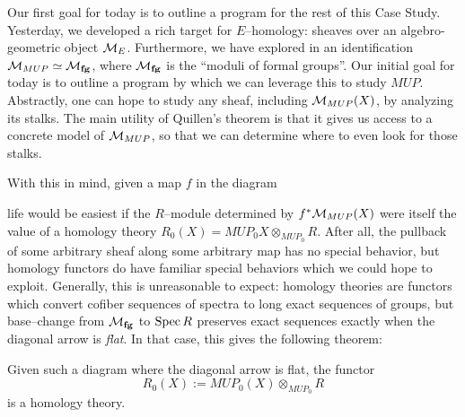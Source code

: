 Our first goal for today is to outline a program for the rest of this Case Study.  Yesterday, we developed a rich target for $E$--homology: sheaves over an algebro-geometric object $\mathcal{M}_{E}$.  Furthermore, we have explored in  an identification $\mathcal{M}_{MUP} \simeq \mathcal{M}_{\mathbf{fg}}$, where $\mathcal{M}_{\mathbf{fg}}$ is the ``moduli of formal groups''.  Our initial goal for today is to outline a program by which we can leverage this to study $MUP$.  Abstractly, one can hope to study any sheaf, including $\mathcal{M}_{MUP}(X)$, by analyzing its stalks.  The main utility of Quillen's theorem is that it gives us access to a concrete model of $\mathcal{M}_{MUP}$, so that we can determine where to even look for those stalks.

With this in mind, given a map $f$ in the diagram
\begin{center}
\end{center}
life would be easiest if the $R$--module determined by $f^* \mathcal{M}_{MUP}(X)$ were itself the value of a homology theory $R_0(X) = MUP_0 X \otimes_{MUP_0} R$.  After all, the pullback of some arbitrary sheaf along some arbitrary map has no special behavior, but homology functors do have familiar special behaviors which we could hope to exploit.  Generally, this is unreasonable to expect: homology theories are functors which convert cofiber sequences of spectra to long exact sequences of groups, but base--change from $\mathcal{M}_{\mathbf{fg}}$ to $\operatorname{Spec} R$ preserves exact sequences exactly when the diagonal arrow is \textit{flat}.  In that case, this gives the following theorem:

\begin{theorem}[Landweber]\label{LandwebersStackyTheorem}
Given such a diagram where the diagonal arrow is flat, the functor \[R_0(X) := MUP_0(X) \otimes_{MUP_0} R\] is a homology theory.
\end{theorem}


